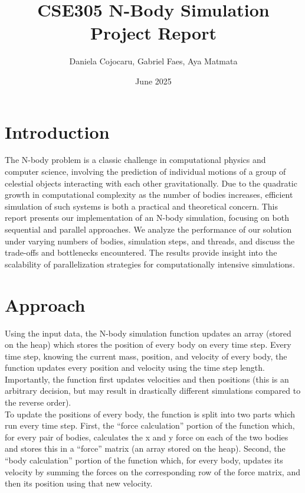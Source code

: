 \documentclass{article}
\title{CSE305 N-Body Simulation Project Report}
\author{Daniela Cojocaru, Gabriel Faes, Aya Matmata}
\date{June 2025}
\begin{document}
\maketitle

\section{Introduction}
The N-body problem is a classic challenge in computational physics and computer science, involving the prediction of individual motions of a group of celestial objects interacting with each other gravitationally. Due to the quadratic growth in computational complexity as the number of bodies increases, efficient simulation of such systems is both a practical and theoretical concern. This report presents our implementation of an N-body simulation, focusing on both sequential and parallel approaches. We analyze the performance of our solution under varying numbers of bodies, simulation steps, and threads, and discuss the trade-offs and bottlenecks encountered. The results provide insight into the scalability of parallelization strategies for computationally intensive simulations.

\section{Approach}
Using the input data, the N-body simulation function updates an array (stored on the heap) which stores the position of every body on every time step. Every time step, knowing the current mass, position, and velocity of every body, the function updates every position and velocity using the time step length. Importantly, the function first updates velocities and then positions (this is an arbitrary decision, but may result in drastically different simulations compared to the reverse order).\\

To update the positions of every body, the function is split into two parts which run every time step. First, the “force calculation” portion of the function which, for every pair of bodies, calculates the x and y force on each of the two bodies and stores this in a “force” matrix (an array stored on the heap). Second, the “body calculation” portion of the function which, for every body, updates its velocity by summing the forces on the corresponding row of the force matrix, and then its position using that new velocity.\\
\end{document}
